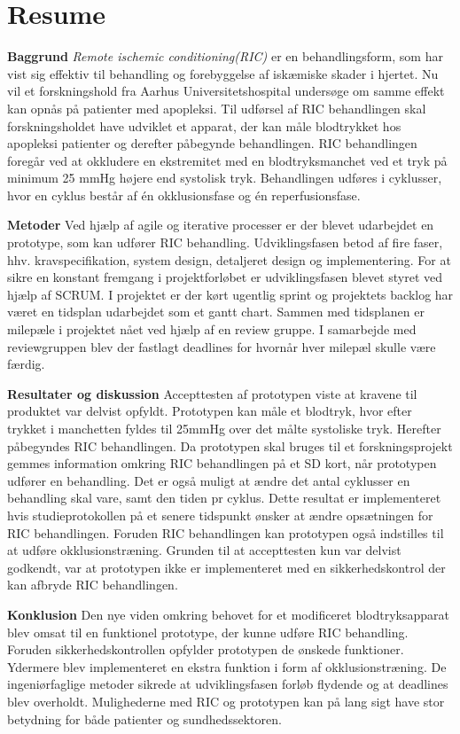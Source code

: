 \chapter*{Resume}
\textbf{Baggrund}
\textit{Remote ischemic conditioning(RIC)} er en behandlingsform, som har vist sig effektiv til behandling og forebyggelse af iskæmiske skader i hjertet. Nu vil et forskningshold fra Aarhus Universitetshospital undersøge om samme effekt kan opnås på patienter med apopleksi. Til udførsel af RIC behandlingen skal forskningsholdet have udviklet et apparat, der kan måle blodtrykket hos apopleksi patienter og derefter påbegynde behandlingen. RIC behandlingen foregår ved at okkludere en ekstremitet med en blodtryksmanchet ved et tryk på minimum 25 mmHg højere end systolisk tryk. Behandlingen udføres i cyklusser, hvor en cyklus består af én okklusionsfase og én reperfusionsfase. 

\textbf{Metoder}
Ved hjælp af agile og iterative processer er der blevet udarbejdet en prototype, som kan udfører RIC behandling. Udviklingsfasen betod af fire faser, hhv. kravspecifikation, system design, detaljeret design og implementering. For at sikre en konstant fremgang i projektforløbet er udviklingsfasen blevet styret ved hjælp af SCRUM. I projektet er der kørt ugentlig sprint og projektets backlog har været en tidsplan udarbejdet som et gantt chart. Sammen med tidsplanen er milepæle i projektet nået ved hjælp af en review gruppe. I samarbejde med reviewgruppen blev der fastlagt deadlines for hvornår hver milepæl skulle være færdig.

\textbf{Resultater og diskussion}
Accepttesten af prototypen viste at kravene til produktet var delvist opfyldt. Prototypen kan måle et blodtryk, hvor efter trykket i manchetten fyldes til 25mmHg over det målte systoliske tryk. Herefter påbegyndes RIC behandlingen. Da prototypen skal bruges til et forskningsprojekt gemmes information omkring RIC behandlingen på et SD kort, når prototypen udfører en behandling. Det er også muligt at ændre det antal cyklusser en behandling skal vare, samt den tiden pr cyklus. Dette resultat er implementeret hvis studieprotokollen på et senere tidspunkt ønsker at ændre opsætningen for RIC behandlingen. Foruden RIC behandlingen kan prototypen også indstilles til at udføre okklusionstræning. Grunden til at accepttesten kun var delvist godkendt, var at prototypen ikke er implementeret med en sikkerhedskontrol der kan afbryde RIC behandlingen. 

\textbf{Konklusion}
 Den nye viden omkring behovet for et modificeret blodtryksapparat blev omsat til en funktionel prototype, der kunne udføre RIC behandling. Foruden sikkerhedskontrollen opfylder prototypen de ønskede funktioner. Ydermere blev implementeret en ekstra funktion i form af okklusionstræning. De ingeniørfaglige metoder sikrede at udviklingsfasen forløb flydende og at deadlines blev overholdt. Mulighederne med RIC og prototypen kan på lang sigt have stor betydning for både patienter og sundhedssektoren.
